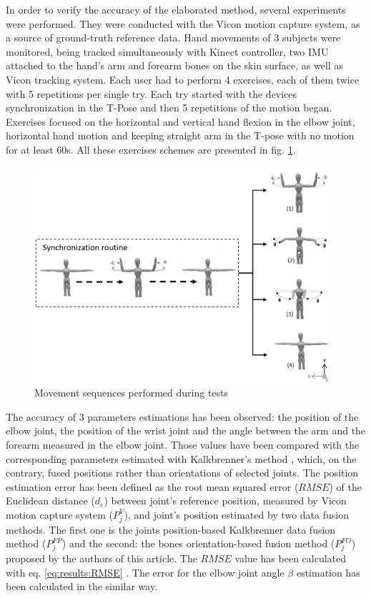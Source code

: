 \documentclass[sensors,article,submit,moreauthors,pdftex,10pt,a4paper]{mdpi}
\begin{document}
	In order to verify the accuracy of the elaborated method, several experiments were performed. They were conducted with the Vicon motion capture system, as a source of ground-truth reference data. Hand movements of 3 subjects were monitored, being tracked simultaneously with Kinect controller, two IMU attached to the hand's arm and forearm bones on the skin surface, as well as Vicon tracking system. Each user had to perform 4 exercises, each of them twice with 5 repetitions per single try. Each try started with the devices synchronization in the T-Pose and then 5 repetitions of the motion began. Exercises focused on the horizontal and vertical hand flexion in the elbow joint, horizontal hand motion and keeping straight arm in the T-pose with no motion for at least 60s. All these exercises schemes are presented in fig. \ref{fig:results:sequences}.
		
	\begin{figure}[H] %
		\centering
		\includegraphics[width=11cm]{Figure11.png}
		\caption{Movement sequences performed during tests}
		\label{fig:results:sequences}
	\end{figure}
		
	The accuracy of 3 parameters estimations has been observed: the position of the elbow joint, the position of the wrist joint and the angle between the arm and the forearm measured in the elbow joint. Those values have been compared with the corresponding parameters estimated with Kalkbrenner’s method \cite{Kalkbrenner2014}, which, on the contrary, fused positions rather than orientations of selected joints. The position estimation error has been defined as the root mean squared error ($RMSE$) of the Euclidean distance ($d_e$) between joint’s reference position, measured by Vicon motion capture system ($P_j^V$), and joint’s position estimated by two data fusion methods. The first one is the joints position-based Kalkbrenner data fusion method ($P_j^{FP}$) and the second: the bones orientation-based fusion method ($P_j^{FO}$) proposed by the authors of this article. The $RMSE$ value has been calculated with eq. \ref{eq:results:RMSE} \cite{Armstrong1992}. The error for the elbow joint angle $\beta$ estimation has been calculated in the similar way.
		
\end{document}
